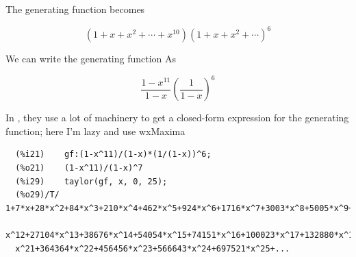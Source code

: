The generating function becomes

\begin{equation*}
  (1 + x + x^2 + \cdots + x^{10})(1+x+x^2+\cdots)^6
\end{equation*}

We can write the generating function As

\begin{equation*}
  \frac{1-x^{11}}{1-x}\left(\frac{1}{1-x}\right)^6
\end{equation*}

In \cite{Tucker}, they use a lot of machinery to get a closed-form expression for the generating function; here I'm lazy and use wxMaxima

\begin{verbatim}
  (%i21)	gf:(1-x^11)/(1-x)*(1/(1-x))^6;
  (%o21)	(1-x^11)/(1-x)^7
  (%i29)	taylor(gf, x, 0, 25);
  (%o29)/T/	1+7*x+28*x^2+84*x^3+210*x^4+462*x^5+924*x^6+1716*x^7+3003*x^8+5005*x^9+8008*x^10+12375*x^11+18557*
  x^12+27104*x^13+38676*x^14+54054*x^15+74151*x^16+100023*x^17+132880*x^18+174097*x^19+225225*x^20+288002*
  x^21+364364*x^22+456456*x^23+566643*x^24+697521*x^25+...
\end{verbatim}



